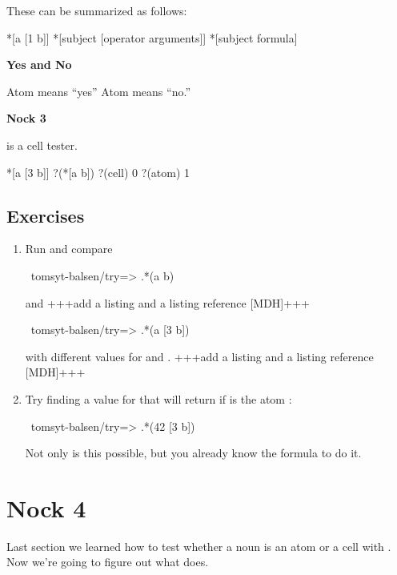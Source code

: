 These can be summarized as follows:

\begin{code}
*[a [1 b]]
*[subject [operator arguments]]
*[subject formula]
\end{code}

\textbf{Yes and No}

Atom  means ``yes''
Atom  means ``no.''

\textbf{Nock 3}

 is a cell tester.
\begin{code}
*[a [3 b]]         ?(*[a b])
?(cell)            0
?(atom)            1
\end{code}

\subsection{Exercises}

\begin{enumerate}
\item Run and compare
\begin{code}
~tomsyt-balsen/try=> .*(a b)
\end{code}
and +++add a listing and a listing reference [MDH]+++
\begin{code}
~tomsyt-balsen/try=> .*(a [3 b])
\end{code}
with different values for  and . +++add a listing and a listing reference [MDH]+++
\item Try finding a value for  that will return  if  is the atom :
\begin{code}
~tomsyt-balsen/try=> .*(42 [3 b])
\end{code}
Not only is this possible, but you already know the formula to do it.
\end{enumerate}

\section{Nock 4}

\label{sec:nock_4}

Last section we learned how to test whether a noun is an atom or a cell with
. Now we're going to figure out what  does.

